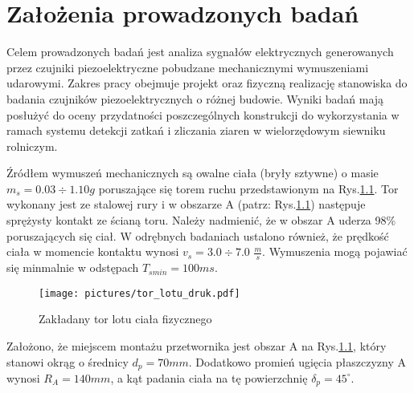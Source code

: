 \chapter{Założenia prowadzonych badań}
\label{sec:assumptions}

Celem prowadzonych badań jest analiza sygnałów elektrycznych generowanych przez czujniki 
piezoelektryczne pobudzane mechanicznymi wymuszeniami udarowymi. Zakres pracy obejmuje 
projekt oraz fizyczną realizację stanowiska do badania czujników piezoelektrycznych o 
różnej budowie. Wyniki badań mają posłużyć do oceny przydatności poszczególnych 
konstrukcji do wykorzystania w ramach systemu detekcji zatkań i zliczania ziaren w 
wielorzędowym siewniku rolniczym.

\indent Źródłem wymuszeń mechanicznych są owalne ciała (bryły sztywne) o masie $m_s=0.03\div1.10 g$ 
poruszające się torem ruchu przedstawionym na Rys.\ref{fig:route}. 
Tor wykonany jest ze stalowej rury i w obszarze A (patrz: Rys.\ref{fig:route}) 
następuje sprężysty kontakt ze ścianą toru. Należy nadmienić, że w obszar A uderza 98\% 
poruszających się ciał. W odrębnych badaniach \cite{g2018} ustalono również, że prędkość ciała 
w momencie kontaktu wynosi $v_s=3.0\div7.0$ $\frac{m}{s}$. Wymuszenia mogą pojawiać 
się minmalnie w odstępach $T_{smin}= 100 ms$.

\begin{figure}[htbp]
\centering
\texttt{[image: pictures/tor\_lotu\_druk.pdf]}
\caption{Zakładany tor lotu ciała fizycznego}
\label{fig:route}
\end{figure}

Założono, że miejscem montażu przetwornika jest obszar A na Rys.\ref{fig:route}, który 
stanowi okrąg o średnicy $d_p=70 mm$. Dodatkowo promień ugięcia płaszczyzny A wynosi 
$R_A=140 mm$, a kąt padania ciała na tę powierzchnię $\delta_p=45^{\circ}$. 

